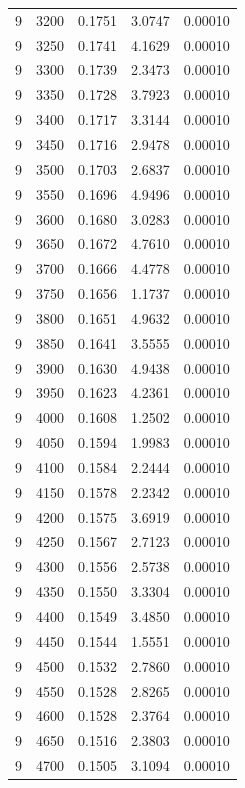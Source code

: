 \begin{longtable}{ccccc}
    9 & 3200 & 0.1751 & 3.0747 & 0.00010 \\
    9 & 3250 & 0.1741 & 4.1629 & 0.00010 \\
    9 & 3300 & 0.1739 & 2.3473 & 0.00010 \\
    9 & 3350 & 0.1728 & 3.7923 & 0.00010 \\
    9 & 3400 & 0.1717 & 3.3144 & 0.00010 \\
    9 & 3450 & 0.1716 & 2.9478 & 0.00010 \\
    9 & 3500 & 0.1703 & 2.6837 & 0.00010 \\
    9 & 3550 & 0.1696 & 4.9496 & 0.00010 \\
    9 & 3600 & 0.1680 & 3.0283 & 0.00010 \\
    9 & 3650 & 0.1672 & 4.7610 & 0.00010 \\
    9 & 3700 & 0.1666 & 4.4778 & 0.00010 \\
    9 & 3750 & 0.1656 & 1.1737 & 0.00010 \\
    9 & 3800 & 0.1651 & 4.9632 & 0.00010 \\
    9 & 3850 & 0.1641 & 3.5555 & 0.00010 \\
    9 & 3900 & 0.1630 & 4.9438 & 0.00010 \\
    9 & 3950 & 0.1623 & 4.2361 & 0.00010 \\
    9 & 4000 & 0.1608 & 1.2502 & 0.00010 \\
    9 & 4050 & 0.1594 & 1.9983 & 0.00010 \\
    9 & 4100 & 0.1584 & 2.2444 & 0.00010 \\
    9 & 4150 & 0.1578 & 2.2342 & 0.00010 \\
    9 & 4200 & 0.1575 & 3.6919 & 0.00010 \\
    9 & 4250 & 0.1567 & 2.7123 & 0.00010 \\
    9 & 4300 & 0.1556 & 2.5738 & 0.00010 \\
    9 & 4350 & 0.1550 & 3.3304 & 0.00010 \\
    9 & 4400 & 0.1549 & 3.4850 & 0.00010 \\
    9 & 4450 & 0.1544 & 1.5551 & 0.00010 \\
    9 & 4500 & 0.1532 & 2.7860 & 0.00010 \\
    9 & 4550 & 0.1528 & 2.8265 & 0.00010 \\
    9 & 4600 & 0.1528 & 2.3764 & 0.00010 \\
    9 & 4650 & 0.1516 & 2.3803 & 0.00010 \\
    9 & 4700 & 0.1505 & 3.1094 & 0.00010 \\

\end{longtable}
